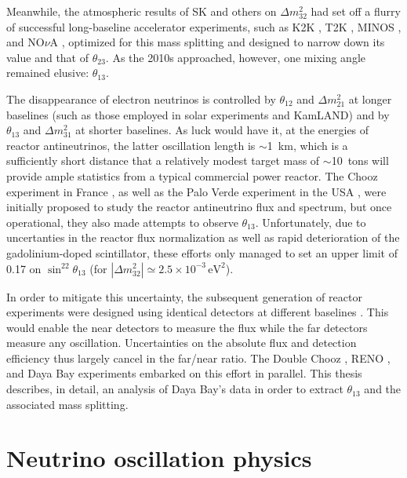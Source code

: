 \documentclass[../thesis.tex]{subfiles}
\begin{document}
Meanwhile, the atmospheric results of SK and others on \(\Delta m^2_{32}\) had set off a flurry of successful long-baseline accelerator experiments, such as K2K \cite{PhysRevD.74.072003}, T2K \cite{ABE2011106}, MINOS \cite{PhysRevLett.101.131802}, and NO$\nu$A \cite{PhysRevLett.123.151803}, optimized for this mass splitting and designed to narrow down its value and that of $\theta_{23}$. As the 2010s approached, however, one mixing angle remained elusive: $\theta_{13}$.

The disappearance of electron neutrinos is controlled by $\theta_{12}$ and \(\Delta m^2_{21}\) at longer baselines (such as those employed in solar experiments and KamLAND) and by $\theta_{13}$ and \(\Delta m^2_{31}\) at shorter baselines. As luck would have it, at the energies of reactor antineutrinos, the latter oscillation length is $\sim$1~km, which is a sufficiently short distance that a relatively modest target mass of $\sim$10~tons will provide ample statistics from a typical commercial power reactor. The Chooz experiment in France \cite{Apollonio_2003}, as well as the Palo Verde experiment in the USA \cite{PhysRevD.62.072002}, were initially proposed to study the reactor antineutrino flux and spectrum, but once operational, they also made attempts to observe $\theta_{13}$. Unfortunately, due to uncertanties in the reactor flux normalization as well as rapid deterioration of the gadolinium-doped scintillator, these efforts only managed to set an upper limit of 0.17 on \(\sin^22\theta_{13}\) (for $|\Delta m^2_{32}| \simeq 2.5\times10^{-3}\,\text{eV}^2$).

In order to mitigate this uncertainty, the subsequent generation of reactor experiments were designed using identical detectors at different baselines \cite{Mikaelyan:1998yg}. This would enable the near detectors to measure the flux while the far detectors measure any oscillation. Uncertainties on the absolute flux and detection efficiency thus largely cancel in the far/near ratio. The Double Chooz \cite{Ardellier:2006mn}, RENO \cite{Ahn:2010vy}, and Daya Bay \cite{Guo:2007ug} experiments embarked on this effort in parallel. This thesis describes, in detail, an analysis of Daya Bay's data in order to extract $\theta_{13}$ and the associated mass splitting.

\section{Neutrino oscillation physics}
\label{sec:oscPhysics}
\end{document}
